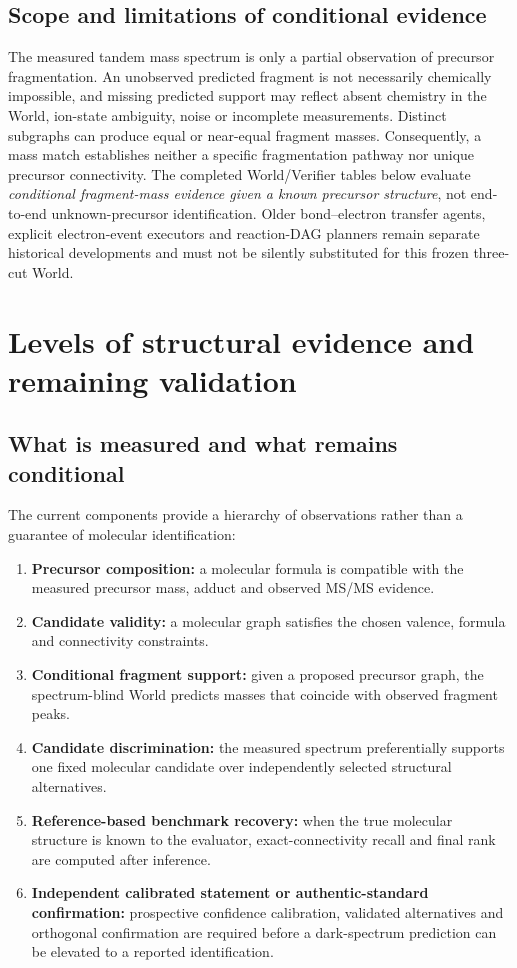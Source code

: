 \documentclass[12pt]{article}
\begin{document}
\subsection{Scope and limitations of conditional evidence}
The measured tandem mass spectrum is only a partial observation of precursor fragmentation. An unobserved predicted fragment is not necessarily chemically impossible, and missing predicted support may reflect absent chemistry in the World, ion-state ambiguity, noise or incomplete measurements. Distinct subgraphs can produce equal or near-equal fragment masses. Consequently, a mass match establishes neither a specific fragmentation pathway nor unique precursor connectivity. The completed World/Verifier tables below evaluate \emph{conditional fragment-mass evidence given a known precursor structure}, not end-to-end unknown-precursor identification. Older bond--electron transfer agents, explicit electron-event executors and reaction-DAG planners remain separate historical developments and must not be silently substituted for this frozen three-cut World.

\section{Levels of structural evidence and remaining validation}

\subsection{What is measured and what remains conditional}
The current components provide a hierarchy of observations rather than a guarantee of molecular identification:
\begin{enumerate}
\item \textbf{Precursor composition:} a molecular formula is compatible with the measured precursor mass, adduct and observed MS/MS evidence.
\item \textbf{Candidate validity:} a molecular graph satisfies the chosen valence, formula and connectivity constraints.
\item \textbf{Conditional fragment support:} given a proposed precursor graph, the spectrum-blind World predicts masses that coincide with observed fragment peaks.
\item \textbf{Candidate discrimination:} the measured spectrum preferentially supports one fixed molecular candidate over independently selected structural alternatives.
\item \textbf{Reference-based benchmark recovery:} when the true molecular structure is known to the evaluator, exact-connectivity recall and final rank are computed after inference.
\item \textbf{Independent calibrated statement or authentic-standard confirmation:} prospective confidence calibration, validated alternatives and orthogonal confirmation are required before a dark-spectrum prediction can be elevated to a reported identification.
\end{enumerate}
\end{document}
